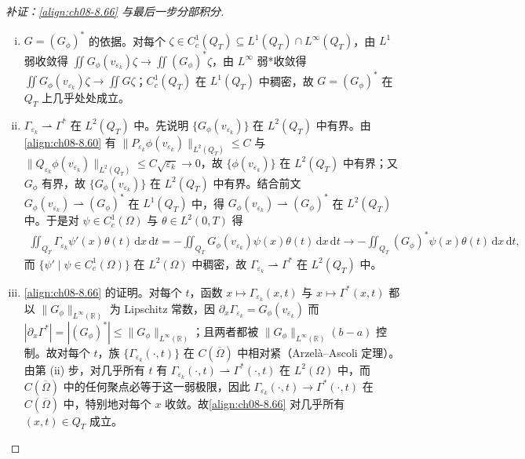 \documentclass[../../main.tex]{subfiles}%
\begin{document}
\begin{proof}[补证：\eqref{align:ch08-8.66} 与最后一步分部积分]
\begin{enumerate}[(i)]
\item $G=(G_\phi)^*$ 的依据。对每个 $\zeta\in C^1_c(Q_T)\subseteq L^1(Q_T)\cap L^\infty(Q_T)$，由 $L^1$ 弱收敛得 $\iint G_\phi(v_{\varepsilon_k})\zeta\to\iint(G_\phi)^*\zeta$，由 $L^\infty$ 弱*收敛得 $\iint G_\phi(v_{\varepsilon_k})\zeta\to\iint G\zeta$；$C^1_c(Q_T)$ 在 $L^1(Q_T)$ 中稠密，故 $G=(G_\phi)^*$ 在 $Q_T$ 上几乎处处成立。
\item $\Gamma_{\varepsilon_k}\rightharpoonup\Gamma^*$ 在 $L^2(Q_T)$ 中。先说明 $\{G_\phi(v_{\varepsilon_k})\}$ 在 $L^2(Q_T)$ 中有界。由\eqref{align:ch08-8.60} 有 $\|P_{\varepsilon_k}\phi(v_{\varepsilon_k})\|_{L^2(Q_T)}\leqslant C$ 与 $\|Q_{\varepsilon_k}\phi(v_{\varepsilon_k})\|_{L^2(Q_T)}\leqslant C\sqrt{\varepsilon_k}\to0$，故 $\{\phi(v_{\varepsilon_k})\}$ 在 $L^2(Q_T)$ 中有界；又 $G_\phi$ 有界，故 $\{G_\phi(v_{\varepsilon_k})\}$ 在 $L^2(Q_T)$ 中有界。结合前文 $G_\phi(v_{\varepsilon_k})\rightharpoonup(G_\phi)^*$ 在 $L^1(Q_T)$ 中，得 $G_\phi(v_{\varepsilon_k})\rightharpoonup(G_\phi)^*$ 在 $L^2(Q_T)$ 中。于是对 $\psi\in C^1_c(\Omega)$ 与 $\theta\in L^2(0,T)$ 得
\begin{align*}
\iint_{Q_T}\Gamma_{\varepsilon_k}\psi'(x)\theta(t)\,\mathrm{d}x\,\mathrm{d}t
=-\iint_{Q_T}G_\phi(v_{\varepsilon_k})\psi(x)\theta(t)\,\mathrm{d}x\,\mathrm{d}t
\to-\iint_{Q_T}(G_\phi)^*\psi(x)\theta(t)\,\mathrm{d}x\,\mathrm{d}t,
\end{align*}
而 $\{\psi'\mid\psi\in C^1_c(\Omega)\}$ 在 $L^2(\Omega)$ 中稠密，故 $\Gamma_{\varepsilon_k}\rightharpoonup\Gamma^*$ 在 $L^2(Q_T)$ 中。
\item \eqref{align:ch08-8.66} 的证明。对每个 $t$，函数 $x\mapsto\Gamma_{\varepsilon_k}(x,t)$ 与 $x\mapsto\Gamma^*(x,t)$ 都以 $\|G_\phi\|_{L^\infty(\mathbb{R})}$ 为 Lipschitz 常数，因 $\partial_x\Gamma_{\varepsilon_k}=G_\phi(v_{\varepsilon_k})$ 而 $|\partial_x\Gamma^*|=|(G_\phi)^*|\leqslant\|G_\phi\|_{L^\infty(\mathbb{R})}$；且两者都被 $\|G_\phi\|_{L^\infty(\mathbb{R})}(b-a)$ 控制。故对每个 $t$，族 $\{\Gamma_{\varepsilon_k}(\cdot,t)\}$ 在 $C(\overline\Omega)$ 中相对紧（Arzelà--Ascoli 定理）。由第 (ii) 步，对几乎所有 $t$ 有 $\Gamma_{\varepsilon_k}(\cdot,t)\rightharpoonup\Gamma^*(\cdot,t)$ 在 $L^2(\Omega)$ 中，而 $C(\overline\Omega)$ 中的任何聚点必等于这一弱极限，因此 $\Gamma_{\varepsilon_k}(\cdot,t)\to\Gamma^*(\cdot,t)$ 在 $C(\overline\Omega)$ 中，特别地对每个 $x$ 收敛。故\eqref{align:ch08-8.66} 对几乎所有 $(x,t)\in Q_T$ 成立。

\end{enumerate}
\end{proof}
\end{document}
